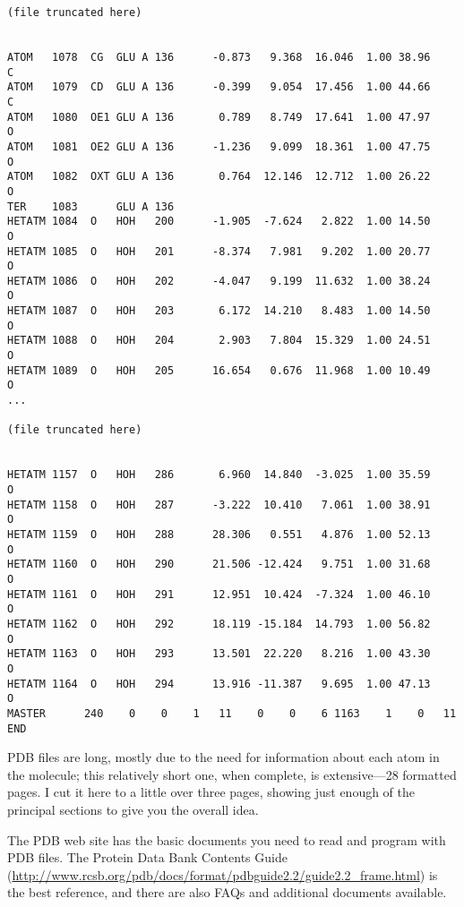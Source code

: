 \begin{lstlisting}
(file truncated here)


ATOM   1078  CG  GLU A 136      -0.873   9.368  16.046  1.00 38.96           C  
ATOM   1079  CD  GLU A 136      -0.399   9.054  17.456  1.00 44.66           C  
ATOM   1080  OE1 GLU A 136       0.789   8.749  17.641  1.00 47.97           O  
ATOM   1081  OE2 GLU A 136      -1.236   9.099  18.361  1.00 47.75           O  
ATOM   1082  OXT GLU A 136       0.764  12.146  12.712  1.00 26.22           O  
TER    1083      GLU A 136                                                      
HETATM 1084  O   HOH   200      -1.905  -7.624   2.822  1.00 14.50           O  
HETATM 1085  O   HOH   201      -8.374   7.981   9.202  1.00 20.77           O  
HETATM 1086  O   HOH   202      -4.047   9.199  11.632  1.00 38.24           O  
HETATM 1087  O   HOH   203       6.172  14.210   8.483  1.00 14.50           O  
HETATM 1088  O   HOH   204       2.903   7.804  15.329  1.00 24.51           O  
HETATM 1089  O   HOH   205      16.654   0.676  11.968  1.00 10.49           O  
... 

(file truncated here)


HETATM 1157  O   HOH   286       6.960  14.840  -3.025  1.00 35.59           O  
HETATM 1158  O   HOH   287      -3.222  10.410   7.061  1.00 38.91           O  
HETATM 1159  O   HOH   288      28.306   0.551   4.876  1.00 52.13           O  
HETATM 1160  O   HOH   290      21.506 -12.424   9.751  1.00 31.68           O  
HETATM 1161  O   HOH   291      12.951  10.424  -7.324  1.00 46.10           O  
HETATM 1162  O   HOH   292      18.119 -15.184  14.793  1.00 56.82           O  
HETATM 1163  O   HOH   293      13.501  22.220   8.216  1.00 43.30           O  
HETATM 1164  O   HOH   294      13.916 -11.387   9.695  1.00 47.13           O  
MASTER      240    0    0    1   11    0    0    6 1163    1    0   11          
END                                                                  
\end{lstlisting}

PDB files are long, mostly due to the need for information about each atom in the molecule; this relatively short one, when complete, is extensive—28 formatted pages. I cut it here to a little over three pages, showing just enough of the principal sections to give you the overall idea.

The PDB web site has the basic documents you need to read and program with PDB files. The Protein Data Bank Contents Guide (\href{http://www.rcsb.org/pdb/docs/format/pdbguide2.2/guide2.2\_frame.html}{http://www.rcsb.org/pdb/docs/format/pdbguide2.2/guide2.2\_frame.html}) is the best reference, and there are also FAQs and additional documents available.

